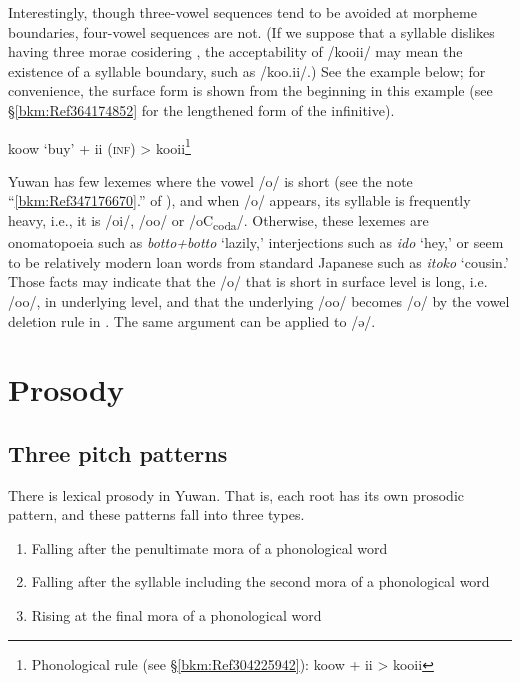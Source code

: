 Interestingly, though three-vowel sequences tend to be avoided at morpheme boundaries, four-vowel sequences are not. (If we suppose that a syllable dislikes having three morae cosidering , the acceptability of /kooii/ may mean the existence of a syllable boundary, such as /koo.ii/.) See the example below; for convenience, the surface form is shown from the beginning in this example (see §\ref{bkm:Ref364174852} for the lengthened form of the infinitive).

\ea koow  ‘buy’  +  ii  (\textsc{inf})  >  kooii\footnote{Phonological rule (see §\ref{bkm:Ref304225942}): koow + ii > kooii} \z

Yuwan has few lexemes where the vowel /o/ is short (see the note “\ref{bkm:Ref347176670}.” of ), and when /o/ appears, its syllable is frequently heavy, i.e., it is /oi/, /oo/ or /oC\textsubscript{coda}/. Otherwise, these lexemes are onomatopoeia such as \textit{botto+botto} ‘lazily,’ interjections such as \textit{ido} ‘hey,’ or seem to be relatively modern loan words from standard Japanese such as \textit{itoko} ‘cousin.’ Those facts may indicate that the /o/ that is short in surface level is long, i.e. /oo/, in underlying level, and that the underlying /oo/ becomes /o/ by the vowel deletion rule in . The same argument can be applied to /ə/.

\section{Prosody}\label{bkm:Ref301560567}\hypertarget{RefHeadingToc395696983}{}
\subsection{Three pitch patterns}\label{bkm:Ref303982713}\hypertarget{RefHeadingToc395696984}{}

There is lexical prosody in Yuwan. That is, each root has its own prosodic pattern, and these patterns fall into three types.

\begin{enumerate}[label=\Roman*.]
\item Falling after the penultimate mora of a phonological word
\item Falling after the syllable including the second mora of a phonological word
\item Rising at the final mora of a phonological word
\end{enumerate}

